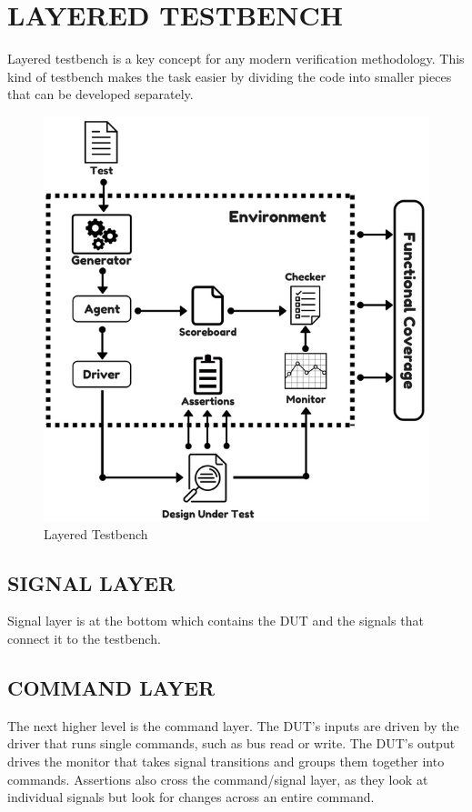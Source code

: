 \section{LAYERED TESTBENCH}
Layered testbench is a key concept for any modern verification methodology. This kind of testbench makes the task easier by dividing the code into smaller pieces that can be developed separately.
\vspace{10pt}
\begin{figure}[h!]
\centering
\includegraphics[scale=0.9]{./figures/layered_testbench.png}
\caption{Layered Testbench}
\label{fig:layered_testbench.png}
\end{figure}

\subsection{SIGNAL LAYER}
Signal layer is at the bottom which contains the DUT and the signals that connect it to the testbench.

\subsection{COMMAND LAYER}
The next higher level is the command layer. The DUT’s inputs are driven by the driver that runs single commands, such as bus read or write. The DUT’s output drives the monitor that takes signal transitions and groups them together into commands. Assertions also cross the command/signal layer, as they look at individual signals but look for changes across an entire command.

